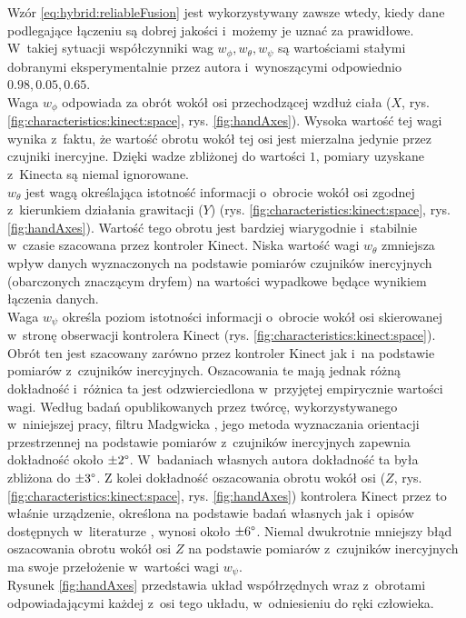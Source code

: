 Wzór \ref{eq:hybrid:reliableFusion} jest wykorzystywany zawsze wtedy, kiedy dane podlegające łączeniu są dobrej jakości i~możemy je uznać za prawidłowe. W~takiej sytuacji współczynniki wag $w_\phi , w_\theta , w_\psi$ są wartościami stałymi dobranymi eksperymentalnie przez autora i~wynoszącymi odpowiednio $0.98,0.05,0.65$.\\
Waga $w_\phi$ odpowiada za obrót wokół osi przechodzącej wzdłuż ciała ($X$, rys. \ref{fig:characteristics:kinect:space}, rys. \ref{fig:handAxes}).
Wysoka wartość tej wagi wynika z~faktu, że wartość obrotu wokół tej osi jest mierzalna jedynie przez czujniki inercyjne. Dzięki wadze zbliżonej do wartości $1$, pomiary uzyskane z~Kinecta są niemal ignorowane.\\
$w_\theta$ jest wagą określająca istotność informacji o~obrocie wokół osi zgodnej z~kierunkiem działania grawitacji ($Y$) (rys. \ref{fig:characteristics:kinect:space}, rys. \ref{fig:handAxes}). Wartość tego obrotu jest bardziej wiarygodnie i~stabilnie w~czasie szacowana przez kontroler Kinect. Niska wartość wagi $w_\theta$ zmniejsza wpływ danych wyznaczonych na podstawie pomiarów czujników inercyjnych (obarczonych znaczącym dryfem) na wartości wypadkowe będące wynikiem łączenia danych.\\ 
Waga $w_\psi$ określa poziom istotności informacji o~obrocie wokół osi skierowanej w~stronę obserwacji kontrolera Kinect (rys. \ref{fig:characteristics:kinect:space}). Obrót ten jest szacowany zarówno przez kontroler Kinect jak i~na podstawie pomiarów z~czujników inercyjnych. Oszacowania te mają jednak różną dokładność i~różnica ta jest odzwierciedlona w~przyjętej empirycznie wartości wagi. Według badań opublikowanych przez twórcę, wykorzystywanego w~niniejszej pracy, filtru Madgwicka \cite{Madgwick2010}, jego metoda wyznaczania orientacji przestrzennej na podstawie pomiarów z~czujników inercyjnych zapewnia dokładność około $\pm2\degree$. W~badaniach własnych autora dokładność ta była zbliżona do $\pm3\degree$. Z kolei dokładność oszacowania obrotu wokół osi ($Z$,  rys. \ref{fig:characteristics:kinect:space}, rys. \ref{fig:handAxes}) 
kontrolera Kinect przez to właśnie urządzenie, określona na podstawie badań własnych jak i~opisów dostępnych w~literaturze \cite{Huber2015}, wynosi około $\pm6\degree$. Niemal dwukrotnie mniejszy błąd 
oszacowania obrotu wokół osi $Z$ 
na podstawie pomiarów z~czujników inercyjnych ma swoje przełożenie w~wartości wagi $w_\psi$.\\
Rysunek \ref{fig:handAxes} przedstawia układ współrzędnych wraz z~obrotami odpowiadającymi każdej z~osi tego układu, w~odniesieniu do ręki człowieka.

